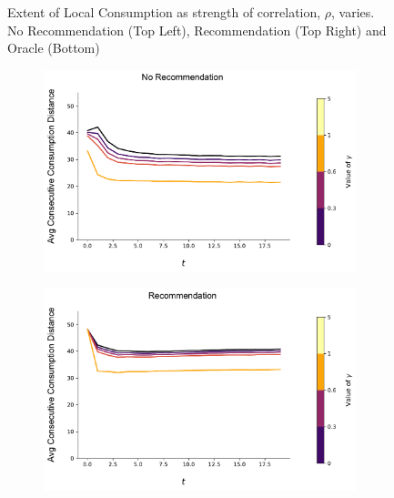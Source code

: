 \documentclass[format=acmsmall, review=false]{acmart}
\begin{document}
\begin{figure}[t]
\begin{subfigure}{.45\textwidth}
\end{subfigure}
\caption{Extent of Local Consumption as strength of correlation, $\rho$, varies. \\ No Recommendation (Top Left), Recommendation (Top Right) and Oracle (Bottom)}
\label{fig:local_consumption_across_rho}
\end{figure}


\begin{figure}[t]
\begin{subfigure}{.45\textwidth}
\includegraphics[width=\linewidth]{figures/gamma_consumption_dist_N_200T_20.pdf}
\end{subfigure}
\begin{subfigure}{.45\textwidth}
\includegraphics[width=\linewidth]{figures/gamma_consumption_dist_N_200T_20_partial.pdf}
\end{subfigure}\\
\begin{subfigure}{.45\textwidth}

\end{subfigure}
\end{figure}
\end{document}
